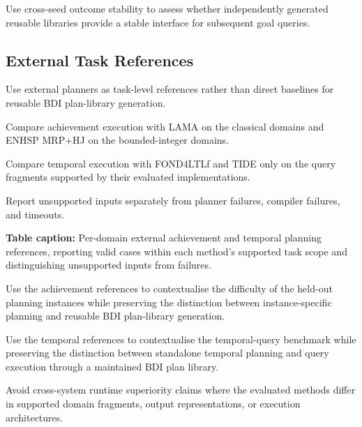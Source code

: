 Use cross-seed outcome stability to assess whether independently generated reusable libraries provide a stable interface for subsequent goal queries.


\subsection{External Task References}

Use external planners as task-level references rather than direct baselines for reusable BDI plan-library generation.

Compare achievement execution with LAMA on the classical domains and ENHSP MRP+HJ on the bounded-integer domains.

Compare temporal execution with FOND4LTLf and TIDE only on the query fragments supported by their evaluated implementations.

Report unsupported inputs separately from planner failures, compiler failures, and timeouts.

\textbf{Table caption:} Per-domain external achievement and temporal planning references, reporting valid cases within each method's supported task scope and distinguishing unsupported inputs from failures.

Use the achievement references to contextualise the difficulty of the held-out planning instances while preserving the distinction between instance-specific planning and reusable BDI plan-library generation.

Use the temporal references to contextualise the temporal-query benchmark while preserving the distinction between standalone temporal planning and query execution through a maintained BDI plan library.

Avoid cross-system runtime superiority claims where the evaluated methods differ in supported domain fragments, output representations, or execution architectures.
